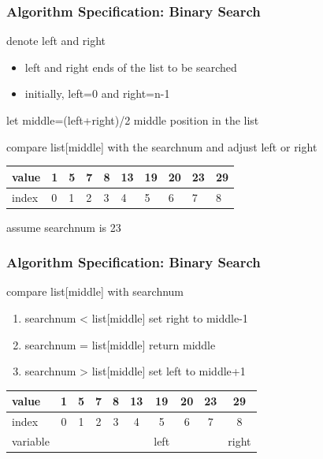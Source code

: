 \documentclass[newPxFont,sthlmFooter,nooffset]{beamer}
\begin{document}
\begin{frame}[t]
  \frametitle{Algorithm Specification: Binary Search}
denote left and right
\begin{itemize}
\item left and right ends of the list to be searched
\item initially, left=0 and right=n-1
\end{itemize}

let middle=(left+right)/2 middle position in the list

compare list[middle] with the searchnum and adjust left or right
	\begin{center}
	\begin{tabular}{| l | l | l | l | l | l | l | l | l | l |}
	\hline
	value & \cellcolor{green}1 & 5 & 7 & 8 & \cellcolor{yellow}13 & 19 & 20 & 23 & \cellcolor{red}29 \\
	\hline
	index & \cellcolor{green}0 & 1 & 2 & 3 & \cellcolor{yellow}4 & 5 & 6 & 7 & \cellcolor{red}8 \\
	\hline
	\end{tabular}
	\end{center}
\begin{center}
		\begin{small}
			 assume searchnum is 23
		\end{small}
\end{center}

\end{frame}
\begin{frame}[t]
  \frametitle{Algorithm Specification: Binary Search}
compare list[middle] with searchnum
\begin{enumerate}
\item searchnum < list[middle] set right to middle-1
\item searchnum = list[middle] return middle 
\item searchnum > list[middle] set left to middle+1
\end{enumerate}
\begin{center}
	\begin{tabular}{| l || c | c | c | c | c | c | c | c | c |}
		\hline
		value & 1 & 5 & 7 & 8 & 13 & \cellcolor{green}19 & 20 & 23 & \cellcolor{red}29 \\
		\hline
		index & 0 & 1 & 2 & 3 & 4 & \cellcolor{green}5 & 6 & 7 & \cellcolor{red}8 \\
		\hline
		variable & & & & & & left & & & right \\
		\hline
	\end{tabular}
\end{center}

\end{frame}
\end{document}
